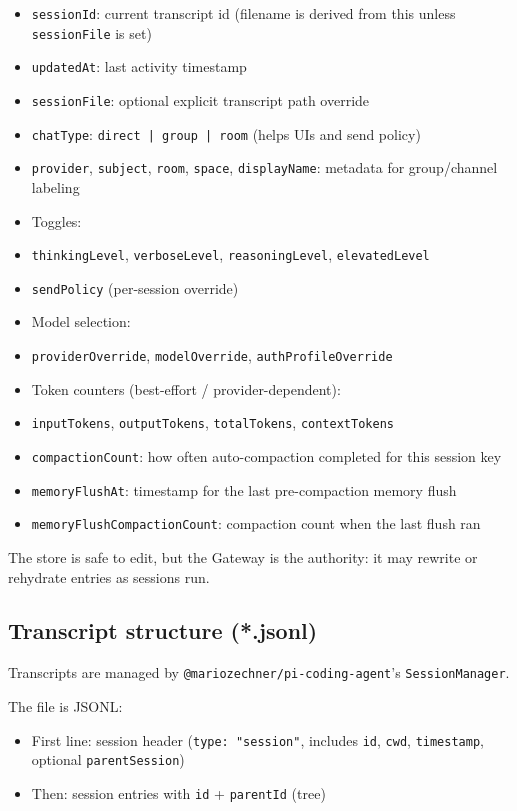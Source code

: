 \begin{itemize}
  \item \texttt{sessionId}: current transcript id (filename is derived from this unless \texttt{sessionFile} is set)
  \item \texttt{updatedAt}: last activity timestamp
  \item \texttt{sessionFile}: optional explicit transcript path override
  \item \texttt{chatType}: \texttt{direct | group | room} (helps UIs and send policy)
  \item \texttt{provider}, \texttt{subject}, \texttt{room}, \texttt{space}, \texttt{displayName}: metadata for group/channel labeling
  \item Toggles:
  \item \texttt{thinkingLevel}, \texttt{verboseLevel}, \texttt{reasoningLevel}, \texttt{elevatedLevel}
  \item \texttt{sendPolicy} (per-session override)
  \item Model selection:
  \item \texttt{providerOverride}, \texttt{modelOverride}, \texttt{authProfileOverride}
  \item Token counters (best-effort / provider-dependent):
  \item \texttt{inputTokens}, \texttt{outputTokens}, \texttt{totalTokens}, \texttt{contextTokens}
  \item \texttt{compactionCount}: how often auto-compaction completed for this session key
  \item \texttt{memoryFlushAt}: timestamp for the last pre-compaction memory flush
  \item \texttt{memoryFlushCompactionCount}: compaction count when the last flush ran
\end{itemize}


The store is safe to edit, but the Gateway is the authority: it may rewrite or rehydrate entries as sessions run.

\hrulefill


\subsection{Transcript structure (*.jsonl)}


Transcripts are managed by \texttt{@mariozechner/pi-coding-agent}’s \texttt{SessionManager}.

The file is JSONL:

\begin{itemize}
  \item First line: session header (\texttt{type: "session"}, includes \texttt{id}, \texttt{cwd}, \texttt{timestamp}, optional \texttt{parentSession})
  \item Then: session entries with \texttt{id} + \texttt{parentId} (tree)
\end{itemize}


